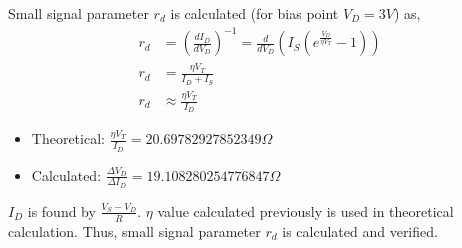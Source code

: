 \documentclass[12pt,a4paper]{article}
\begin{document}
\newline Small signal parameter $r_d$ is calculated (for bias point $V_D = 3V$) as,
\begin{align*}
    r_d &= \left(\frac{dI_D}{dV_D}\right)^{-1} = \frac{d}{dV_D}(I_S(e^{\frac{V_D}{\eta V_T}} - 1))\\
    r_d &= \frac{\eta V_T}{I_D + I_S}\\
    r_d &\approx \frac{\eta V_T}{I_D}
\end{align*}

\begin{itemize}
    \item Theoretical: $\frac{\eta V_T}{I_D} = 20.69782927852349\Omega$
    \item Calculated: $\frac{\Delta V_D}{\Delta I_D} = 19.108280254776847\Omega$
\end{itemize}
$I_D$ is found by $\frac{V_S - V_D}{R}$. $\eta$ value calculated previously is used in theoretical calculation. Thus, small signal parameter $r_d$ is calculated and verified.
\end{document}
